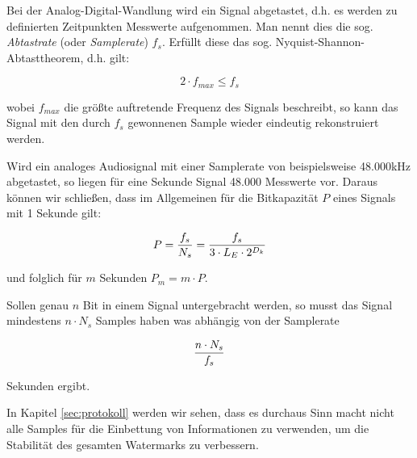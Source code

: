 Bei der Analog-Digital-Wandlung wird ein Signal abgetastet, d.h. es werden zu definierten Zeitpunkten Messwerte aufgenommen. Man nennt dies die sog. \textit{Abtastrate} (oder \textit{Samplerate}) $f_s$. Erfüllt diese das sog. Nyquist-Shannon-Abtasttheorem\cite{shannon1949communication}, d.h. gilt: 

	 \begin{equation}
		 2 \cdot f_{max} \leq f_s
	 	\label{equ:abtasttheorem}
	 \end{equation}
	
wobei ${f}_{max}$ die größte auftretende Frequenz des Signals beschreibt, so kann das Signal mit den durch $f_s$ gewonnenen Sample wieder eindeutig rekonstruiert werden.

Wird ein analoges Audiosignal mit einer Samplerate von beispielsweise 48.000kHz abgetastet, so liegen für eine Sekunde Signal 48.000 Messwerte vor. Daraus können wir schließen, dass im Allgemeinen für die Bitkapazität $P$ eines Signals mit 1 Sekunde gilt: 

	 \begin{equation}
		 P = { {f}_{s} \over N_s } = { {f}_{s} \over 3 \cdot {L}_{E} \cdot 2 ^ {{D}_{k}} }
	 	\label{equ:bitcapacity_1sec}
	 \end{equation}

und folglich für $m$ Sekunden ${P}_{m} = m \cdot P$. 

Sollen genau $n$ Bit in einem Signal untergebracht werden, so musst das Signal mindestens $n \cdot {N}_{s}$ Samples haben was abhängig von der Samplerate

	 \begin{equation}
		 { n \cdot {N}_{s} \over {f}_{s} }
	 	\label{equ:bitcapacity_seconds}
	 \end{equation}
	 
Sekunden ergibt. 

In Kapitel \ref{sec:protokoll} werden wir sehen, dass es durchaus Sinn macht nicht alle Samples für die Einbettung von Informationen zu verwenden, um die Stabilität des gesamten Watermarks zu verbessern. 






